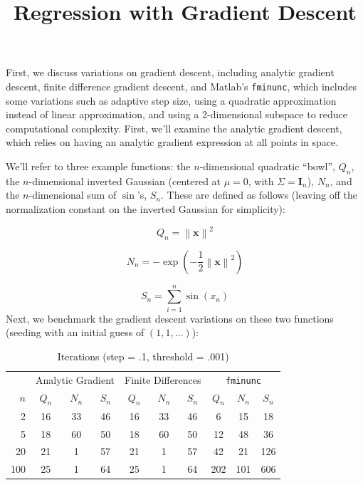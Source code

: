 \documentclass[11pt,letterpaper]{article}
\title{Regression with Gradient Descent\vspace{-3.5ex}}
\begin{document}
\maketitle
\vspace{-3em}
\section{}
First, we discuss variations on gradient descent, including analytic gradient descent, finite difference gradient descent, and Matlab's \texttt{fminunc}, which includes some variations such as adaptive step size, using a quadratic approximation instead of linear approximation, and using a 2-dimensional subspace to reduce computational complexity. First, we'll examine the analytic gradient descent, which relies on having an analytic gradient expression at all points in space.

We'll refer to three example functions: the $n$-dimensional quadratic ``bowl'', $Q_n$, the $n$-dimensional inverted Gaussian (centered at $\mu = 0$, with $\Sigma = \mathbf I_n$), $N_n$, and the $n$-dimensional sum of $\sin$'s, $S_n$. These are defined as follows (leaving off the normalization constant on the inverted Gaussian for simplicity):

\[ Q_n = \left\| \mathbf x \right\| ^2 \]

\[ N_n = -\exp{\left(-\dfrac{1}{2} \left\| \mathbf x \right\| ^2 \right)} \]

\[ S_n = \sum_{i=1}^n \sin(x_n) \]
Next, we benchmark the gradient descent variations on these two functions (seeding with an initial guess of $(1,1,\ldots)$):

\begin{table}[h]
\centering
\caption{Iterations (step = .1, threshold = .001)}
\begin{tabular}{r|ccc|ccc|ccc}
   & \multicolumn{3}{|c}{Analytic Gradient} & \multicolumn{3}{|c}{Finite Differences} & \multicolumn{3}{|c}{\texttt{fminunc}} \\
$n$& $Q_n$         & $N_n$        & $S_n$   & $Q_n$              & $N_n$   & $S_n$           & $Q_n$         & $N_n$        & $S_n$ \\\hline
2  & 16            & 33           & 46      & 16                 & 33      & 46              & 6             & 15           & 18    \\
5  & 18            & 60           & 50      & 18                 & 60      & 50              & 12            & 48           & 36    \\
20 & 21            &  1           & 57      & 21                 &  1      & 57              & 42            & 21           & 126   \\
100& 25            &  1           & 64      & 25                 &  1      & 64              & 202           & 101          & 606   
\end{tabular}
\end{table}
\end{document}

